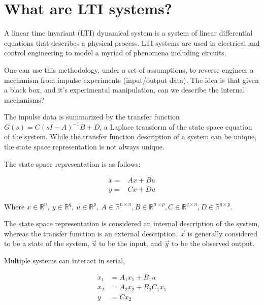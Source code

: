 \documentclass[a4paper, 11 pt]{article}
\begin{document}
\section{What are LTI systems?}

A linear time invariant (LTI) dynamical system is a system of linear differential equations that describes a physical process. LTI systems are used in electrical and control engineering to model a myriad of phenomena including circuits. 

One can use this methodology, under a set of assumptions, to reverse engineer a mechanism from impulse experiments (input/output data). The idea is that given a black box, and it's experimental manipulation, can we describe the internal mechanisms? 

The inpulse data is summarized by the transfer function $G(s) = C( sI - A )^{-1} B + D$, a Laplace transform of the state space equation of the system. While the transfer function description of a system can be unique, the state space representation is not always unique.

The state space representation is as follows:

\begin{equation}
  \begin{split}
    \dot{x} =& Ax + Bu \\
y =& Cx + Du
\end{split}
\end{equation}

Where $x \in \mathbb{R}^{n}, \ y \in \mathbb{R}^{q}, \ u \in \mathbb{R}^{p}, \ A \in \mathbb{R}^{n \times n}, B \in \mathbb{R}^{n \times p}, C \in \mathbb{R}^{q \times n}, D \in \mathbb{R}^{q \times p}$. 

The state space representation is considered an internal description of the system, whereas the transfer function is an external description. $\vec{x}$ is generally considered to be a state of the system, $\vec{u}$ to be the input, and $\vec{y}$ to be the observed output. 

Multiple systems can interact in serial, 

\begin{equation}
  \begin{split}
    \dot{x}_{1} &= A_{1}x_{1} + B_{1}u \\
    \dot{x}_{2} &= A_{2}x_{2} + B_{2}C_{1}x_{1} \\
    y &= Cx_{2}
\end{split}
\end{equation}
\end{document}
